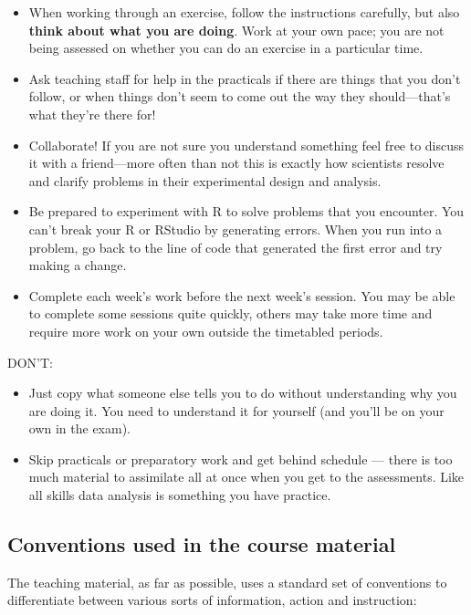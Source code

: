 \documentclass[]{book}
\begin{document}
\begin{itemize}
\item
  When working through an exercise, follow the instructions carefully,
  but also \textbf{think about what you are doing}. Work at your own
  pace; you are not being assessed on whether you can do an exercise in
  a particular time.
\item
  Ask teaching staff for help in the practicals if there are things that
  you don't follow, or when things don't seem to come out the way they
  should---that's what they're there for!
\item
  Collaborate! If you are not sure you understand something feel free to
  discuss it with a friend---more often than not this is exactly how
  scientists resolve and clarify problems in their experimental design
  and analysis.
\item
  Be prepared to experiment with R to solve problems that you encounter.
  You can't break your R or RStudio by generating errors. When you run
  into a problem, go back to the line of code that generated the first
  error and try making a change.
\item
  Complete each week's work before the next week's session. You may be
  able to complete some sessions quite quickly, others may take more
  time and require more work on your own outside the timetabled periods.
\end{itemize}

DON'T:

\begin{itemize}
\item
  Just copy what someone else tells you to do without understanding why
  you are doing it. You need to understand it for yourself (and you'll
  be on your own in the exam).
\item
  Skip practicals or preparatory work and get behind schedule --- there
  is too much material to assimilate all at once when you get to the
  assessments. Like all skills data analysis is something you have
  practice.
\end{itemize}

\subsection{Conventions used in the course material}\label{conventions}

The teaching material, as far as possible, uses a standard set of
conventions to differentiate between various sorts of information,
action and instruction:
\end{document}
